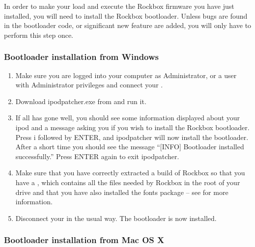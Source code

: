 

In order to make your \dap{} load and execute the Rockbox firmware you
have just installed, you will need to install the Rockbox
bootloader. Unless bugs are found in the bootloader code, or
significant new feature are added, you will only have to perform this
step once.

\subsubsection{Bootloader installation from Windows}

\begin{enumerate}

\item Make sure you are logged into your computer as Administrator, or a 
user with Administrator privileges and connect your \dap{}.

\item Download ipodpatcher.exe from 
and run it.

\item If all has gone well, you should see some information displayed about
your ipod and a message asking you if you wish to install the Rockbox
bootloader. Press i followed by ENTER, and ipodpatcher will now
install the bootloader. After a short time you should see the message
``[INFO] Bootloader installed successfully.'' Press ENTER again to exit
ipodpatcher.

\item Make sure that you have correctly extracted a build of Rockbox so that
you have a , which contains all the files needed by Rockbox
in the root of your \daps{} drive and that you have also installed the fonts
package -- see  for more information.

\item Disconnect your \dap{} in the usual way. The bootloader is now installed. 

\end{enumerate}

\subsubsection{Bootloader installation from Mac OS X}

